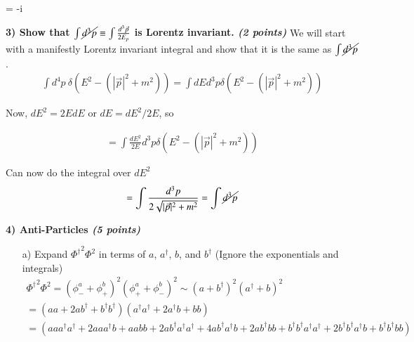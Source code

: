 {\begin{itemize}
{\be
{} = -i 
\ee
}

\end{itemize}

\vspace*{0.25in}

\textbf{3) Show that $\int \cancel{d^3p} \equiv \int \frac{d^3\vec{p}}{2E_p}$ is Lorentz invariant. \hfill \textit{(2 points)}}
We will start with a manifestly Lorentz invariant integral and show that it is the same as $\int \cancel{d^3p}$.
\begin{eqnarray*}
\int d^4p\ \delta(E^2 - (|\vec{p}|^2 + m^2)) = \int dEd^3p \delta(E^2 - (|\vec{p}|^2 + m^2))
\end{eqnarray*}

Now, $dE^2 = 2E dE$ or $dE = dE^2/2E$, so

\begin{eqnarray*}
 = \int \frac{dE^2}{2E}d^3p \delta(E^2 - (|\vec{p}|^2 + m^2))
\end{eqnarray*}

Can now do the integral over $dE^2$
\begin{eqnarray*}
 = \int \frac{d^3p}{2\sqrt{|\vec{p}|^2 + m^2}}  = \int \cancel{d^3p}
\end{eqnarray*}





\newpage
\textbf{4) Anti-Particles  \hfill \textit{(5 points)}}
\begin{itemize}
\item[a)] {Expand ${\Phi^\dagger}^2 \Phi^2$  in terms of $a$, $a^\dagger$, $b$, and $b^\dagger$  (Ignore the exponentials and integrals)\\

\begin{align*}
{\Phi^\dagger}^2 \Phi^2 = \left(\phi_-^a + \phi_+^b\right)^2 \left(\phi_+^a + \phi_-^b\right)^2 \sim \left(a + b^\dagger \right)^2 \left(a^\dagger + b \right)^2\\
                        =  \left(aa + 2ab^\dagger + b^\dagger b^\dagger \right) \left(a^\dagger a^\dagger + 2 a^\dagger b + bb \right)\\
                        =  \left(aa a^\dagger a^\dagger  + 2 aa a^\dagger b + aabb +  2ab^\dagger a^\dagger a^\dagger + 4 ab^\dagger a^\dagger b + 2ab^\dagger bb  + b^\dagger b^\dagger a^\dagger a^\dagger + 2 b^\dagger b^\dagger a^\dagger b + b^\dagger b^\dagger bb \right) 
\end{align*}
}



\end{itemize}}
